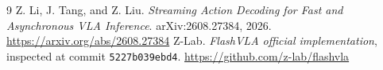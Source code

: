 \documentclass[11pt]{article}
\begin{document}
\begin{thebibliography}{9}
 Z. Li, J. Tang, and Z. Liu. \emph{Streaming Action Decoding for Fast and Asynchronous VLA Inference}. arXiv:2608.27384, 2026. \url{https://arxiv.org/abs/2608.27384}
 Z-Lab. \emph{FlashVLA official implementation}, inspected at commit \texttt{5227b039ebd4}. \url{https://github.com/z-lab/flashvla}
\end{thebibliography}
\end{document}
